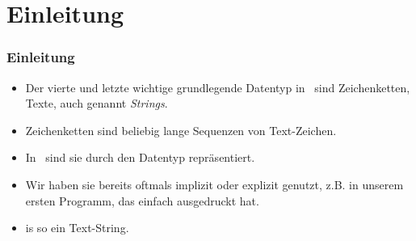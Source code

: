 \documentclass[aspectratio=169,mathserif,notheorems]{beamer}%
\subtitle{11.~Der Datentyp str}%
\begin{document}
%
%
\startPresentation%
%
\section{Einleitung}%
\begin{frame}%
\frametitle{Einleitung}%
\begin{itemize}%
\item Der vierte und letzte wichtige grundlegende Datentyp in \python\ sind Zeichenketten, Texte, auch genannt \emph{Strings}.%
\item<2-> Zeichenketten sind beliebig lange Sequenzen von Text-Zeichen.%
\item<3-> In \python\ sind sie durch den Datentyp  repräsentiert.%
\item<4-> Wir haben sie bereits oftmals implizit oder explizit genutzt, z.B. in unserem ersten Programm, das einfach  ausgedruckt hat.%
\item<5->  is so ein Text-String.%
\end{itemize}%
\end{frame}%
%
%
\end{document}
